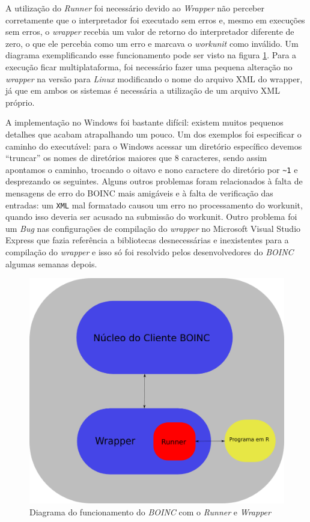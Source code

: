 A utilização do \emph{Runner} foi necessário devido ao \emph{Wrapper} não perceber corretamente
que o interpretador foi executado sem erros e, mesmo em execuções sem erros, o \emph{wrapper} 
recebia um valor de retorno do interpretador diferente de zero, o que ele percebia como um erro
e marcava o \emph{workunit} como inválido. Um diagrama exemplificando esse funcionamento pode ser visto 
na figura \ref{diagrama-boinc-wrapper-windows}. Para a execução ficar multiplataforma, foi necessário 
fazer uma pequena alteração no \emph{wrapper} na versão para \emph{Linux} modificando o nome do
arquivo XML do wrapper, já que em ambos os sistemas é necessária a utilização de um arquivo XML próprio.


A implementação no Windows foi bastante difícil: existem muitos pequenos detalhes que acabam
atrapalhando um pouco. Um dos exemplos foi especificar o caminho do executável: para o Windows acessar
um diretório específico devemos ``truncar'' os nomes de diretórios maiores que $8$ caracteres, sendo 
assim apontamos o caminho, trocando o oitavo e nono caractere do diretório por \verb#~1# 
e desprezando os seguintes. 
Alguns outros problemas foram relacionados à falta de mensagens de erro do BOINC mais amigáveis e
à falta de verificação das entradas: um \verb#XML# mal formatado causou um erro  no processamento
do workunit, quando isso deveria ser acusado na submissão do workunit. Outro problema foi um \emph{Bug}
nas configurações de compilação do \emph{wrapper} no Microsoft Visual Studio Express %
que fazia referência a bibliotecas desnecessárias e inexistentes para a compilação do \emph{wrapper}
e isso só foi resolvido pelos desenvolvedores do \emph{BOINC} algumas semanas depois. 


\begin{figure}[!h]
  \centering
  \includegraphics[scale=0.3]{boinc-diagram-runner.png}
  \caption{Diagrama do funcionamento do \emph{BOINC} com o \emph{Runner} e \emph{Wrapper}}
  \label{diagrama-boinc-wrapper-windows}
\end{figure}
 

